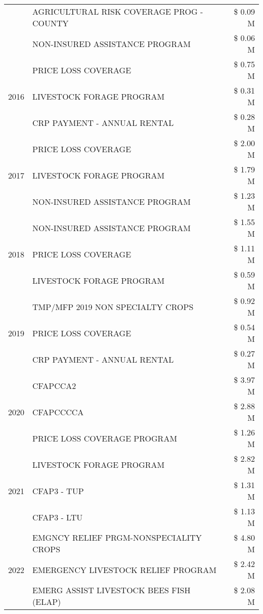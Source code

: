 \begin{tabular}{llr}
 & AGRICULTURAL RISK COVERAGE PROG - COUNTY & \$ 0.09 M \\
 & NON-INSURED ASSISTANCE PROGRAM & \$ 0.06 M \\
\cline{1-3}
\multirow[t]{3}{*}{2016} & PRICE LOSS COVERAGE & \$ 0.75 M \\
 & LIVESTOCK FORAGE PROGRAM & \$ 0.31 M \\
 & CRP PAYMENT - ANNUAL RENTAL & \$ 0.28 M \\
\cline{1-3}
\multirow[t]{3}{*}{2017} & PRICE LOSS COVERAGE & \$ 2.00 M \\
 & LIVESTOCK FORAGE PROGRAM & \$ 1.79 M \\
 & NON-INSURED ASSISTANCE PROGRAM & \$ 1.23 M \\
\cline{1-3}
\multirow[t]{3}{*}{2018} & NON-INSURED ASSISTANCE PROGRAM & \$ 1.55 M \\
 & PRICE LOSS COVERAGE & \$ 1.11 M \\
 & LIVESTOCK FORAGE PROGRAM & \$ 0.59 M \\
\cline{1-3}
\multirow[t]{3}{*}{2019} & TMP/MFP 2019 NON SPECIALTY CROPS & \$ 0.92 M \\
 & PRICE LOSS COVERAGE & \$ 0.54 M \\
 & CRP PAYMENT - ANNUAL RENTAL & \$ 0.27 M \\
\cline{1-3}
\multirow[t]{3}{*}{2020} & CFAPCCA2 & \$ 3.97 M \\
 & CFAPCCCCA & \$ 2.88 M \\
 & PRICE LOSS COVERAGE PROGRAM & \$ 1.26 M \\
\cline{1-3}
\multirow[t]{3}{*}{2021} & LIVESTOCK FORAGE PROGRAM & \$ 2.82 M \\
 & CFAP3 - TUP & \$ 1.31 M \\
 & CFAP3 - LTU & \$ 1.13 M \\
\cline{1-3}
\multirow[t]{3}{*}{2022} & EMGNCY RELIEF PRGM-NONSPECIALITY CROPS & \$ 4.80 M \\
 & EMERGENCY LIVESTOCK RELIEF PROGRAM & \$ 2.42 M \\
 & EMERG ASSIST LIVESTOCK BEES FISH (ELAP) & \$ 2.08 M \\
\cline{1-3}
\bottomrule
\end{tabular}
